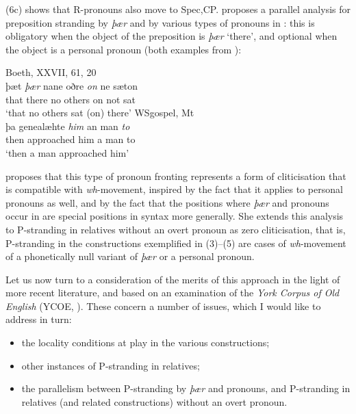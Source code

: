 \documentclass[output=paper]{langsci/langscibook}
\begin{document}
(6c) shows that R-pronouns also move to Spec,CP. 
proposes a parallel analysis for preposition stranding by \textit{þær} and by
various types of pronouns in : this is obligatory when the object of
the preposition is \textit{þær} ‘there’, and optional when the object is a
personal pronoun (both examples from
\citealt[117]{vanKemenade1987}):

\ea%
    \label{ex:key:11.7}
	\ea Boeth, XXVII, 61, 20\\
	\gll þæt \textit{þær}   nane oðre    \textit{on} ne sæton   \\
       		that there no    others on  not sat \\
   	\glt ‘that no others sat (on) there’
	\ex WSgospel, Mt\\
	\gll þa    genealæhte  \textit{him} an man \textit{to}  \\
		then approached him  a   man to\\
	\glt ‘then a man approached him’
	\z
\z

 proposes that this type of pronoun
fronting
represents a form of cliticisation that is compatible with
\textit{wh}-movement, inspired by the fact that it applies to personal pronouns
as well, and by the fact that the positions where \textit{þær} and pronouns
occur in  are special positions in  syntax more generally. She
extends this analysis to P-stranding in relatives without an overt pronoun as
zero cliticisation, that is, P-stranding in the constructions exemplified in
(3)--(5) are cases of \textit{wh}-movement of a phonetically null variant of
\textit{þær} or a personal pronoun.

Let us now turn to a consideration of the merits of this approach in the light
of more recent literature, and based on an examination of the \textit{York
Corpus of Old English} (YCOE, \citealt{Tayloretal2003}). These concern a number
of issues, which I would like to address in turn:

\begin{itemize}

    \item the locality conditions at play in the various constructions;

    \item other instances of P-stranding in
        relatives;

    \item the parallelism between P-stranding by
        \textit{þær} and pronouns, and P-strand\-ing in
        relatives (and related constructions) without an overt pronoun.

\end{itemize}
\end{document}
